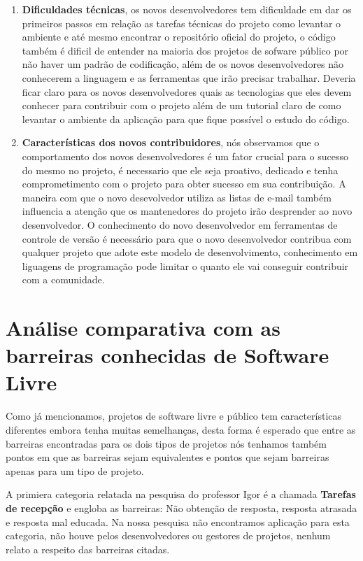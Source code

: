 \begin{enumerate}
\item \textbf{Dificuldades técnicas}, os novos desenvolvedores tem dificuldade em dar os
primeiros passos em relação as tarefas técnicas do projeto como levantar o ambiente e até
mesmo encontrar o repositório oficial do projeto, o código também é dificil de entender
na maioria dos projetos de sofware público por não haver um padrão de codificação, além de 
os novos desenvolvedores não conhecerem a linguagem e as ferramentas que irão precisar trabalhar.
Deveria ficar claro para os novos desenvolvedores quais as tecnologias que eles 
devem conhecer para contribuir com o projeto além de um tutorial claro de como levantar 
o ambiente da aplicação para que fique possível o estudo do código.

\item \textbf{Características dos novos contribuidores}, nós observamos que o comportamento 
dos novos desenvolvedores é um fator crucial para o sucesso do mesmo no projeto, é necessario
que ele seja proativo, dedicado e tenha comprometimento com o projeto para obter sucesso
em sua contribuição. A maneira com que o novo desevolvedor utiliza as listas de e-mail
também influencia a atenção que os mantenedores do projeto irão desprender ao novo
desenvolvedor. O conhecimento do novo desenvolvedor em ferramentas de controle de versão
é necessário para que o novo desenvolvedor contribua com qualquer projeto que adote este
modelo de desenvolvimento, conhecimento em liguagens de programação pode limitar o quanto ele 
vai conseguir contribuir com a comunidade.

\end{enumerate}

\section{Análise comparativa com as barreiras conhecidas de Software Livre}

Como já mencionamos, projetos de software livre e público tem características 
diferentes embora tenha muitas semelhanças, desta forma é esperado que entre as
barreiras encontradas para os dois tipos de projetos nós tenhamos também pontos 
em que as barreiras sejam equivalentes e pontos que sejam barreiras apenas para
um tipo de projeto.

A primiera categoria relatada na pesquisa do professor Igor é a chamada \textbf{Tarefas
de recepção} e engloba as barreiras: Não obtenção de resposta, resposta atrasada e
resposta mal educada. Na nossa pesquisa não encontramos aplicação para esta categoria,
não houve pelos desenvolvedores ou gestores de projetos, nenhum relato a respeito das 
barreiras citadas.

